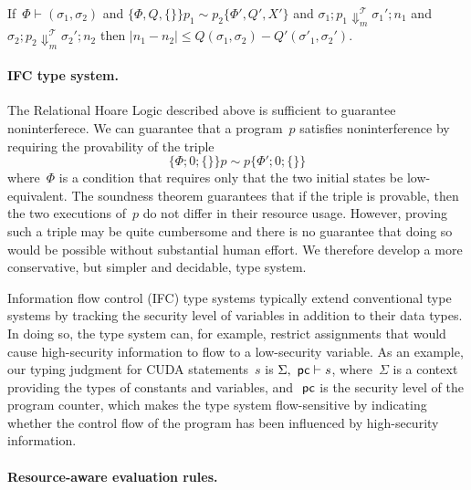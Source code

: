 \begin{theorem}
If~$\Phi \vdash (\sigma_1, \sigma_2)$ and
$\{\Phi, Q, \{\}\} p_1 \sim p_2 \{\Phi', Q', X'\}$
and $\sigma_1; p_1 \Downarrow^{\mathcal{T}}_m \sigma_1'; n_1$
and $\sigma_2; p_2 \Downarrow^{\mathcal{T}}_m \sigma_2'; n_2$
then $|n_1 - n_2| \leq Q(\sigma_1, \sigma_2) - Q'(\sigma'_1, \sigma_2')$.
\end{theorem}


\paragraph{IFC type system.}
The Relational Hoare Logic described above is sufficient to guarantee noninterferece.
%
We can guarantee that a program~$p$ satisfies noninterference by requiring the
provability of the triple
\[\{\Phi; 0; \{\}\} p \sim p \{\Phi'; 0; \{\}\}\]
where~$\Phi$ is a condition that requires only that the two initial states be low-equivalent.
%
The soundness theorem guarantees that if the triple is provable, then the two executions of~$p$ do not differ in their resource usage.
%
However, proving such a triple may be quite cumbersome and there is no guarantee that doing so would be possible without substantial human effort.
%
We therefore develop a more conservative, but simpler and decidable, type system.

Information flow control (IFC) type systems typically extend conventional type systems by tracking the security level of variables in addition to their data types.
%
In doing so, the type system can, for example, restrict assignments that would
cause high-security information to flow to a low-security variable.
%
As an example, our typing judgment for CUDA statements~$s$ is
$\Sigma, ~\mathsf{pc} \vdash s$,
where~$\Sigma$ is a context providing the types of constants and variables,
and $~\mathsf{pc}$ is the security level of the program counter, which makes the type
system flow-sensitive by indicating whether the control flow of the program
has been influenced by high-security information.


\paragraph{Resource-aware evaluation rules.}



